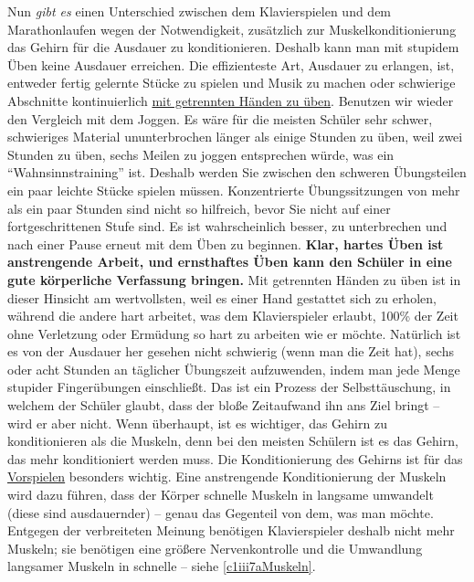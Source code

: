 Nun \textit{gibt es} einen Unterschied zwischen dem Klavierspielen und dem Marathonlaufen wegen der Notwendigkeit, zusätzlich zur Muskelkonditionierung das Gehirn für die Ausdauer zu konditionieren.
Deshalb kann man mit stupidem Üben keine Ausdauer erreichen.
Die effizienteste Art, Ausdauer zu erlangen, ist, entweder fertig gelernte Stücke zu spielen und Musik zu machen oder schwierige Abschnitte kontinuierlich \hyperref[c1ii7]{mit getrennten Händen zu üben}.
Benutzen wir wieder den Vergleich mit dem Joggen.
Es wäre für die meisten Schüler sehr schwer, schwieriges Material ununterbrochen länger als einige Stunden zu üben, weil zwei Stunden zu üben, sechs Meilen zu joggen entsprechen würde, was ein \enquote{Wahnsinnstraining} ist.
Deshalb werden Sie zwischen den schweren Übungsteilen ein paar leichte Stücke spielen müssen.
Konzentrierte Übungssitzungen von mehr als ein paar Stunden sind nicht so hilfreich, bevor Sie nicht auf einer fortgeschrittenen Stufe sind.
Es ist wahrscheinlich besser, zu unterbrechen und nach einer Pause erneut mit dem Üben zu beginnen.
\textbf{Klar, hartes Üben ist anstrengende Arbeit, und ernsthaftes Üben kann den Schüler in eine gute körperliche Verfassung bringen.}
Mit getrennten Händen zu üben ist in dieser Hinsicht am wertvollsten, weil es einer Hand gestattet sich zu erholen, während die andere hart arbeitet, was dem Klavierspieler erlaubt, 100\% der Zeit ohne Verletzung oder Ermüdung so hart zu arbeiten wie er möchte.
Natürlich ist es von der Ausdauer her gesehen nicht schwierig (wenn man die Zeit hat), sechs oder acht Stunden an täglicher Übungszeit aufzuwenden, indem man jede Menge stupider Fingerübungen einschließt.
Das ist ein Prozess der Selbsttäuschung, in welchem der Schüler glaubt, dass der bloße Zeitaufwand ihn ans Ziel bringt -- wird er aber nicht.
Wenn überhaupt, ist es wichtiger, das Gehirn zu konditionieren als die Muskeln, denn bei den meisten Schülern ist es das Gehirn, das mehr konditioniert werden muss.
Die Konditionierung des Gehirns ist für das \hyperref[c1iii14]{Vorspielen} besonders wichtig.
Eine anstrengende Konditionierung der Muskeln wird dazu führen, dass der Körper schnelle Muskeln in langsame umwandelt (diese sind ausdauernder) -- genau das Gegenteil von dem, was man möchte.
Entgegen der verbreiteten Meinung benötigen Klavierspieler deshalb nicht mehr Muskeln; sie benötigen eine größere Nervenkontrolle und die Umwandlung langsamer Muskeln in schnelle -- siehe \hyperref[c1iii7aMuskeln]{\autoref{c1iii7aMuskeln}}.


